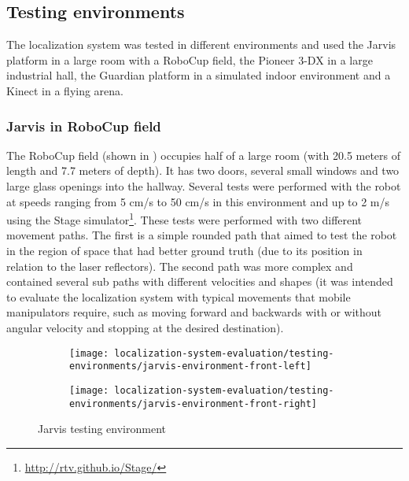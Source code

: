 \subsection{Testing environments}

The localization system was tested in different environments and used the Jarvis platform in a large room with a RoboCup field, the Pioneer 3-DX in a large industrial hall, the Guardian platform in a simulated indoor environment and a Kinect in a flying arena.


\subsubsection{Jarvis in RoboCup field}

The RoboCup field (shown in ) occupies half of a large room (with 20.5 meters of length and 7.7 meters of depth). It has two doors, several small windows and two large glass openings into the hallway. Several tests were performed with the robot at speeds ranging from 5 cm/s to 50 cm/s in this environment and up to 2 m/s using the Stage simulator\footnote{\url{http://rtv.github.io/Stage/}}. These tests were performed with two different movement paths. The first is a simple rounded path that aimed to test the robot in the region of space that had better ground truth (due to its position in relation to the laser reflectors). The second path was more complex and contained several sub paths with different velocities and shapes (it was intended to evaluate the localization system with typical movements that mobile manipulators require, such as moving forward and backwards with or without angular velocity and stopping at the desired destination).


\begin{figure}[H]
	\centering
	\begin{subfigure}[ht]{0.49\textwidth}
		\centering
		\texttt{[image: localization-system-evaluation/testing-environments/jarvis-environment-front-left]}
	\end{subfigure}
	\begin{subfigure}[ht]{0.49\textwidth}
		\centering
		\texttt{[image: localization-system-evaluation/testing-environments/jarvis-environment-front-right]}
	\end{subfigure}
	\caption{Jarvis testing environment}
	\label{fig:localization-system-evaluation_jarvis-tests-environment}
\end{figure}


